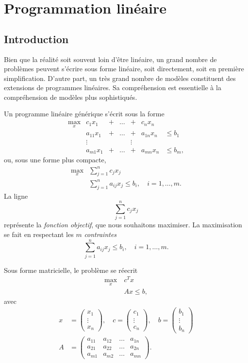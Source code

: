 \chapter{Programmation linéaire}

\section{Introduction}

Bien que la réalité soit souvent loin d'être linéaire, un grand nombre de problèmes peuvent s'écrire sous forme linéaire, soit directement, soit en première simplification.
D'autre part, un très grand nombre de modèles constituent des extensions de programmes linéaires. Sa compréhension est essentielle à la compréhension de modèles plus sophistiqués.

Un programme linéaire générique s'écrit sous la forme
\[
\begin{matrix}
\max_x & c_1x_1 & + & \ldots & + & c_n x_n \\
& a_{11}x_1 & + & \ldots & + & a_{1n} x_n & \leq b_1 \\
& \vdots & & & \vdots \\
& a_{m1}x_1 & + & \ldots & + & a_{mn} x_n & \leq b_m,
\end{matrix}
\]
ou, sous une forme plus compacte,
\begin{align*}
\max_x & \sum_{j = 1}^n c_jx_j \\
& \sum_{j = 1}^n a_{ij}x_j \leq b_i, \quad i = 1,\ldots,m.
\end{align*}
La ligne
\[
\sum_{j = 1}^n c_jx_j
\]
représente la {\sl fonction objectif}, que nous souhaitons maximiser.
La maximisation se fait en respectant les $m$ {\sl contraintes}
\[
\sum_{j = 1}^n a_{ij}x_j \leq b_i, \quad i = 1,\ldots,m.
\]

Sous forme matricielle, le problème se réecrit
\begin{align*}
\max_x\ & c^T x \\
& Ax \leq b,
\end{align*}
avec
\begin{align*}
x &= \begin{pmatrix} x_1 \\ \vdots \\ x_n \end{pmatrix}, \quad
c = \begin{pmatrix} c_1 \\ \vdots \\ c_n \end{pmatrix}, \quad
b = \begin{pmatrix} b_1 \\ \vdots \\ b_n \end{pmatrix} \\
A &= \begin{pmatrix}
a_{11} & a_{12} & \ldots & a_{1n} \\
a_{21} & a_{22} & \ldots & a_{2n} \\
a_{m1} & a_{m2} & \ldots & a_{mn}
\end{pmatrix}.
\end{align*}

